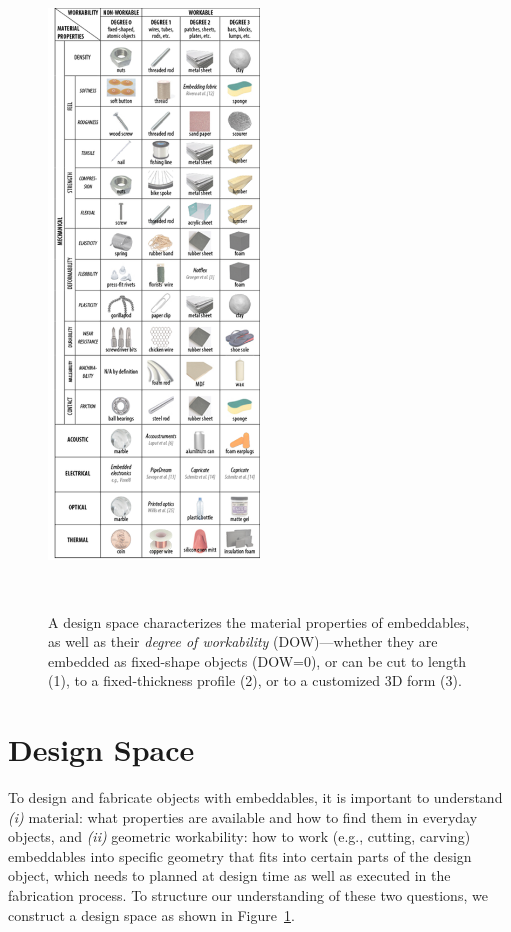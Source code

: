 \begin{figure}
  \centering
  \includegraphics[width=0.5\textwidth]{figures/design_space.pdf}
  \caption{A design space characterizes the material properties of embeddables, as well as their \textit{degree of workability} (DOW)---whether they are embedded as fixed-shape objects (DOW=0), or can be cut to length (1), to a fixed-thickness profile (2), or to a customized 3D form (3).}~\label{fig:design_space}
\end{figure}

\section{Design Space}
To design and fabricate objects with embeddables, it is important to understand {\em (i)} material: what properties are available and how to find them in everyday objects, and {\em (ii)} geometric workability: how to work (e.g., cutting, carving) embeddables into specific geometry that fits into certain parts of the design object, which needs to planned at design time as well as executed in the fabrication process. To structure our understanding of these two questions, we construct a design space as shown in Figure~\ref{fig:design_space}. 

